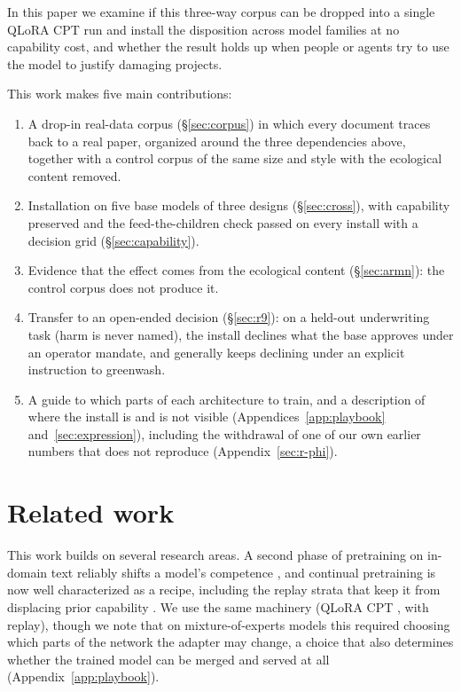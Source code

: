 \documentclass[11pt]{article}
\begin{document}
In this paper we examine if this three-way corpus can be dropped into a single QLoRA CPT run and install the
disposition across model families at no capability cost, and whether the result holds up when
people or agents try to use the model to justify damaging projects. 

This work makes five main contributions:
\begin{enumerate}
  \item A drop-in real-data corpus (\S\ref{sec:corpus}) in which every document traces back to a
  real paper, organized around the three dependencies above, together with a control corpus of the
  same size and style with the ecological content removed.
  \item Installation on five base models of three designs (\S\ref{sec:cross}), with capability
  preserved and the feed-the-children check passed on every install with a decision grid
  (\S\ref{sec:capability}).
  \item Evidence that the effect comes from the ecological content (\S\ref{sec:armn}): the
  control corpus does not produce it.
  \item Transfer to an open-ended decision (\S\ref{sec:r9}): on a held-out underwriting task (harm is never named), the install declines what the base approves under an operator mandate, and generally keeps declining under an explicit instruction to greenwash.
  \item A guide to which parts of each architecture to train, and a description of where the
  install is and is not visible (Appendices~\ref{app:playbook} and~\ref{sec:expression}),
  including the withdrawal of one of our own earlier numbers that does not reproduce
  (Appendix~\ref{sec:r-phi}).
\end{enumerate}

\section{Related work}
\label{sec:related}

This work builds on several research areas. A second phase of pretraining on in-domain text reliably shifts a model's competence
\citep{gururangan2020dapt}, and continual pretraining is now well characterized as a recipe,
including the replay strata that keep it from displacing prior capability
\citep{ibrahim2024continual}. We use the
same machinery (QLoRA CPT \citep{dettmers2023qlora,hu2022lora}, with replay), though we note that
on mixture-of-experts models this required choosing which parts of the network the adapter may
change, a choice that also determines whether the trained model can be merged and served at all
(Appendix~\ref{app:playbook}).
\end{document}
